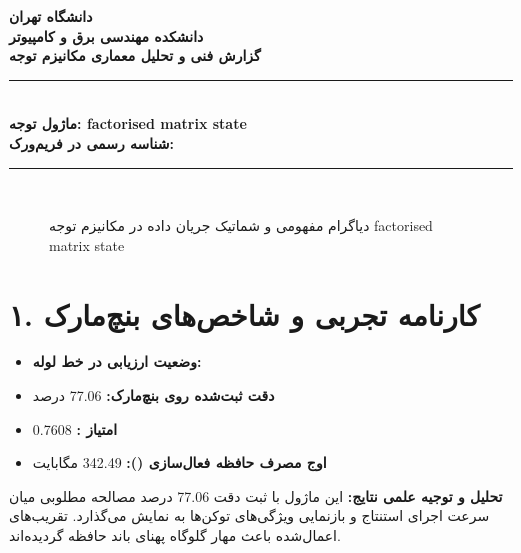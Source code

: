 \documentclass[12pt,a4paper]{article}
\begin{document}
\begin{center}
{\Large\bfseries دانشگاه تهران}\\[0.2cm]
{\large\bfseries دانشکده مهندسی برق و کامپیوتر}\\[0.2cm]
{\large\bfseries گزارش فنی و تحلیل معماری مکانیزم توجه}\\[0.5cm]
\rule{\linewidth}{1pt}\\[0.3cm]
{\LARGE\bfseries ماژول توجه: factorised matrix state}\\[0.2cm]
{\large \textbf{شناسه رسمی در فریم‌ورک:} }\\[0.2cm]
\rule{\linewidth}{1pt}\\[0.5cm]
\end{center}

\begin{figure}[H]
\centering
{}
\caption{دیاگرام مفهومی و شماتیک جریان داده در مکانیزم توجه factorised matrix state}
\end{figure}

\section*{۱. کارنامه تجربی و شاخص‌های بنچ‌مارک}
\begin{itemize}
\item \textbf{وضعیت ارزیابی در خط لوله:} 
\item \textbf{دقت ثبت‌شده روی بنچ‌مارک:} 77.06 درصد
\item \textbf{امتیاز :} 0.7608
\item \textbf{اوج مصرف حافظه فعال‌سازی ():} 342.49 مگابایت
\end{itemize}
\textbf{تحلیل و توجیه علمی نتایج:} این ماژول با ثبت دقت 77.06 درصد مصالحه مطلوبی میان سرعت اجرای استنتاج و بازنمایی ویژگی‌های توکن‌ها به نمایش می‌گذارد. تقریب‌های اعمال‌شده باعث مهار گلوگاه پهنای باند حافظه گردیده‌اند.
\end{document}
